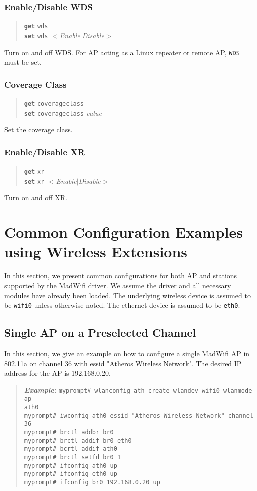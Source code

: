 \documentclass[10pt,fullpage]{article}
\newcommand{\mytt}[1]{{\texttt{#1}}}
\newcommand{\bv}{\begin{verse}}
\newcommand{\ev}{\end{verse}}
\newcommand{\cmd}[1]{{\texttt{myprompt\# #1}}}
\newcommand{\clicmd}[1]{{\textbf{\texttt{#1}}}}
\newcommand{\cliparam}[1]{{\texttt{#1}}}
\newcommand{\clival}[1]{{\emph{#1}}}
\newenvironment{example}{\begin{quote}\textbf{\textit{Example}:}}{\end{quote}}
\begin{document}
\subsubsection{Enable/Disable WDS}
\bv
\clicmd{get} \cliparam{wds}\\
\clicmd{set} \cliparam{wds} $<$\clival{Enable}$|$\clival{Disable}$>$
\ev
Turn on and off WDS. For AP acting as a Linux repeater or remote AP,
\cliparam{WDS} must be set.

\subsubsection{Coverage Class}
\bv
\clicmd{get} \cliparam{coverageclass}\\
\clicmd{set} \cliparam{coverageclass} \clival{value}
\ev
Set the coverage class.

\subsubsection{Enable/Disable XR}
\bv
\clicmd{get} \cliparam{xr}\\
\clicmd{set} \cliparam{xr} $<$\clival{Enable}$|$\clival{Disable}$>$
\ev
Turn on and off XR.

\section{Common Configuration Examples using Wireless Extensions}
In this section, we present common configurations for both AP and
stations supported by the MadWifi driver.  We assume the driver and
all necessary modules have already been loaded.  The underlying
wireless device is assumed to be \mytt{wifi0} unless otherwise noted.
The ethernet device is assumed to be \mytt{eth0}.


\subsection{Single AP on a Preselected Channel}
In this section, we give an example on how to configure a single
MadWifi AP in 802.11a on channel 36 with essid "Atheros Wireless
Network". The desired IP address for the AP is 192.168.0.20.
\begin{example}
  \cmd{wlanconfig ath create wlandev wifi0 wlanmode ap}\\
  \mytt{ath0}\\
  \cmd{iwconfig ath0 essid "Atheros Wireless Network" channel 36}\\
  \cmd{brctl addbr br0}\\
  \cmd{brctl addif br0 eth0}\\
  \cmd{bcrtl addif ath0}\\
  \cmd{brctl setfd br0 1}\\
  \cmd{ifconfig ath0 up}\\
  \cmd{ifconfig eth0 up}\\
  \cmd{ifconfig br0 192.168.0.20 up}
\end{example}
\end{document}

